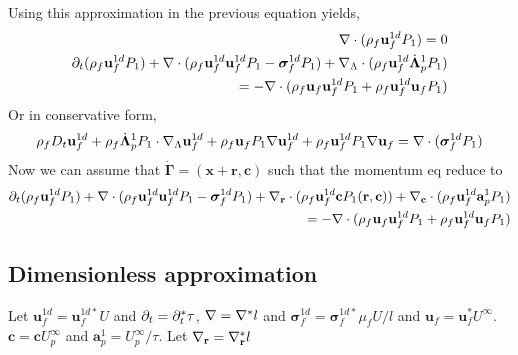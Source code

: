 Using this approximation in the previous equation yields, 
\begin{align*}
    \mathbf{\nabla}\cdot (
        \rho_f  \textbf{u}_f^{1d} P_1 
        )
    = 
    0 \\
    \partial_t (\rho_f \textbf{u}_f^{1d}  P_1)
    + \mathbf{\nabla}\cdot (
         \rho_f \textbf{u}_f^{1d} \textbf{u}_f^{1d}  P_1
        - \bm\sigma_f^{1d} P_1
        )
    +  \mathbf{\nabla}_\Lambda \cdot ( \rho_f \textbf{u}_f^{1d} \dot{\bm\Lambda}_p^1  P_1 )\\
    = 
    - \mathbf{\nabla}\cdot (
         \rho_f \textbf{u}_f \textbf{u}_f^{1d}  P_1
        + \rho_f \textbf{u}_f^{1d} \textbf{u}_f  P_1
        )
\end{align*}
Or in conservative form, 
\begin{align*}
    \rho_f D_t \textbf{u}_f^{1d}  
    +  \rho_f  \dot{\bm\Lambda}_p^1  P_1   \cdot \mathbf{\nabla}_\Lambda \textbf{u}_f^{1d} 
    + \rho_f \textbf{u}_f  P_1 \mathbf{\nabla} \textbf{u}_f^{1d}
    +  \rho_f \textbf{u}_f^{1d} P_1 \mathbf{\nabla}\textbf{u}_f
    = 
    \mathbf{\nabla}\cdot ( \bm\sigma_f^{1d} P_1)
\end{align*}
Now we can assume that $\bm\dot{\Gamma} =(\textbf{x}+ \textbf{r},\textbf{c})$ such that the momentum eq reduce to 
\begin{align*}
    \partial_t (\rho_f \textbf{u}_f^{1d}  P_1)
    + \mathbf{\nabla}\cdot (
         \rho_f \textbf{u}_f^{1d} \textbf{u}_f^{1d}  P_1
        - \bm\sigma_f^{1d} P_1
        )
    +  \mathbf{\nabla}_\textbf{r} \cdot ( \rho_f \textbf{u}_f^{1d} \textbf{c}  P_1(\textbf{r},\textbf{c}) )
    +  \mathbf{\nabla}_\textbf{c} \cdot ( \rho_f \textbf{u}_f^{1d} \textbf{a}_p^1  P_1 )\\
    = 
    - \mathbf{\nabla}\cdot (
         \rho_f \textbf{u}_f \textbf{u}_f^{1d}  P_1
        + \rho_f \textbf{u}_f^{1d} \textbf{u}_f  P_1
        )
\end{align*}

\subsection{Dimensionless approximation}
Let $\textbf{u}^{1d}_f = \textbf{u}^{1d*}_f U$ and $\partial_t = \partial_t^* \tau$, $\mathbf{\nabla} = \mathbf{\nabla}^* l$ and $\bm\sigma^{1d}_f = \bm\sigma^{1d*}_f \mu_f U/l$ and $\textbf{u}_f = \textbf{u}_f^* U^\infty$.
$\textbf{c} = \textbf{c}U^\infty_p$ and $\textbf{a}_p^1 = U^\infty_p / \tau$. 
Let $\mathbf{\nabla}_\textbf{r} = \mathbf{\nabla}_\textbf{r}^* l$ 

